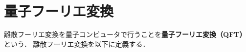 \section{量子フーリエ変換}
\label{sec:quantum-fourier-transform}

離散フーリエ変換を量子コンピュータで行うことを\textbf{量子フーリエ変換（QFT）}という．
離散フーリエ変換を以下に定義する．

